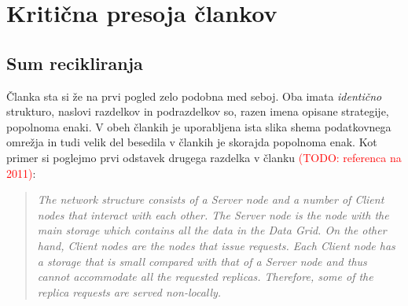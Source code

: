 \documentclass[a4paper, 12pt]{book}
\newcommand{\TODO}[1]{\textcolor{red}{(TODO: #1)}}
\newenvironment{itquote}
{\begin{quote}\itshape}
{\end{quote}}
\begin{document}


\chapter{Kritična presoja člankov}

\section{Sum recikliranja}

Članka sta si že na prvi pogled zelo podobna med seboj. Oba imata
\textit{identično} strukturo, naslovi razdelkov in podrazdelkov so, razen
imena opisane strategije, popolnoma enaki. V obeh člankih je uporabljena ista
slika shema podatkovnega omrežja in tudi velik del besedila v člankih je
skorajda popolnoma enak. Kot primer si poglejmo prvi odstavek drugega razdelka
v članku \TODO{referenca na 2011}:

\begin{itquote}
The network structure consists of a Server node and a number of
Client nodes that interact with each other. The Server node is the node
with the main storage which contains all the data in the Data Grid. On
the other hand, Client nodes are the nodes that issue requests. Each
Client node has a storage that is small compared with that of a Server
node and thus cannot accommodate all the requested replicas.
Therefore, some of the replica requests are served non-locally.
\end{itquote}
\end{document}
